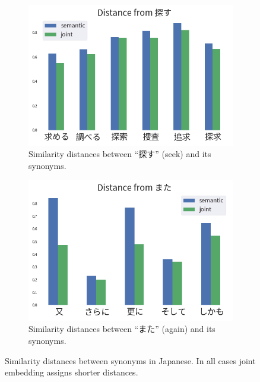\begin{CJK}{UTF8}{ipxm}
\begin{figure}[h]
\begin{subfigure}[b]{0.46\textwidth}
            \label{fig:similarity_ja2}
        \end{subfigure}
        \begin{subfigure}[b]{0.46\textwidth}
            \centering
            \includegraphics[width=\textwidth]{../images/similarity_ja3.png}
            \caption{Similarity distances between ``探す'' (seek) and its synonyms.}
            \label{fig:similarity_ja3}
        \end{subfigure}
        \hspace{2em}
        \begin{subfigure}[b]{0.46\textwidth}
            \centering
            \includegraphics[width=\textwidth]{../images/similarity_ja4.png}
            \caption{Similarity distances between ``\mbox{また}'' (again) and its synonyms.}
            \label{fig:similarity_ja4}
        \end{subfigure}
        \caption{Similarity distances between synonyms in Japanese.  In all cases joint embedding assigns shorter distances.}
        \label{fig:similarity_ja}
    \end{figure}
    \end{CJK}

